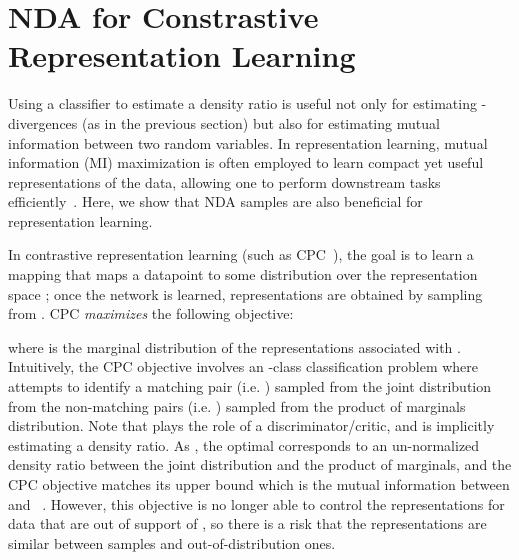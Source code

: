 \documentclass{article} \usepackage{iclr2021_conference,times}
\begin{document}
\section{NDA for Constrastive Representation Learning}




Using a classifier to estimate a density ratio is useful not only for estimating -divergences (as in the previous section) but also for estimating mutual information between two random variables.
In representation learning, mutual information (MI) maximization is often employed to learn 
compact yet useful  representations 
of the data,
allowing one to perform downstream tasks efficiently~\citep{tishby2015deep,nguyen2008estimating,poole2019on,oord2018representation}. Here, we show that NDA samples are also beneficial for representation learning.  








In contrastive representation learning (such as CPC~\citep{oord2018representation}), the goal is to learn a mapping  that maps a datapoint  to some distribution over the representation space ; once the network  is learned,  representations are obtained by sampling from .
CPC \textit{maximizes} the following objective:

where  is the marginal  distribution of the representations associated with . 
Intuitively, the CPC objective involves an -class classification problem  where  attempts to identify a matching pair (i.e. ) sampled from the joint distribution from the  non-matching pairs (i.e. ) sampled from the product of marginals distribution. Note that  plays the role of a discriminator/critic, and is implicitly estimating a density ratio. As , the optimal  corresponds to an un-normalized density ratio between the joint distribution and the product of marginals, and the CPC objective matches its upper bound which is the mutual information between  and ~\citep{poole2019variational,song2019understanding}.
However, this objective is no longer able to control the representations for data that are out of support of , so there is a risk that the representations are similar between  samples and out-of-distribution ones. 
\end{document}
